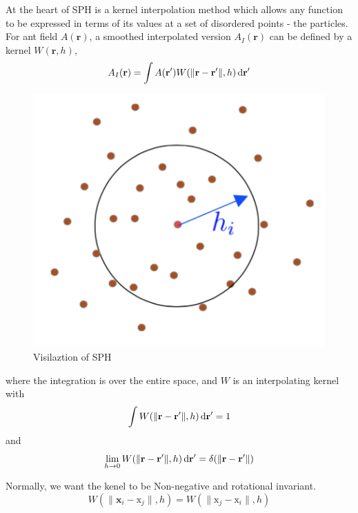    At the heart of SPH is a kernel interpolation method which allows any function to be expressed in terms of its values at a set of disordered points - the particles\cite{monaghan1992smoothed}. For ant field $A(\textbf{r})$, a smoothed interpolated version $A_{I}(\textbf{r})$ can be defined by a kernel $W(\textbf{r}, h)$,
    \begin{equation}
        A_{I}(\textbf{r}) = \int A({\textbf{r}}^{\prime})W(\|\textbf{r} - \textbf{r}^{\prime}\|, h)\,\mathrm{d}\textbf{r}^{\prime}
    \end{equation}
    \begin{figure}[!ht]
        \centering
        \includegraphics[scale = 0.6]{Figures/sph}
        \caption{Visilaztion of SPH}
    \end{figure}

    where the integration is over the entire space, and $W$ is an interpolating kernel with 
    \begin{equation}
        \int W(\|\textbf{r} - \textbf{r}^{\prime}\|, h)\,\mathrm{d} \textbf{r}^{\prime} = 1
    \end{equation}
    and
    \begin{equation}
        \lim_{h\to 0} W(\|\textbf{r} - \textbf{r}^{\prime}\|, h)\,\mathrm{d}\textbf{r}^{\prime} = \delta(\|\textbf{r} - \textbf{r}^{\prime}\|) 
    \end{equation}

    Normally, we want the kenel to be Non-negative and rotational invariant.
    \begin{equation}
        W(\|\textbf{x}_{i} - \text{x}_{j}\|, h) = W(\|\text{x}_{j} - \text{x}_{i}\|, h)
    \end{equation}

